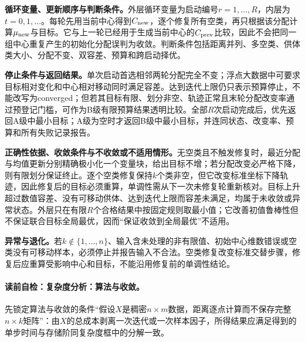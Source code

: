 \label{struct:V4-C02-CH23}
\textbf{循环变量、更新顺序与判断条件。}外层循环变量为启动编号$r=1,\ldots,R$，内层为$t=0,1,\ldots$。每轮先用当前中心得到$C_{\rm new}$，逐个修复所有空类，再只根据该分配计算$\mu_{\rm new}$与目标。它与上一轮已经用于生成当前中心的$C_{\rm prev}$比较，因此不会把同一组中心重复产生的初始化分配误判为收敛。判断条件包括距离并列、多空类、供体类大小、分配不变、双容差、预算和跨启动择优。

\label{struct:V4-C02-CH24}
\textbf{停止条件与返回结果。}单次启动首选相邻两轮分配完全不变；浮点大数据中可要求目标相对变化和中心相对移动同时满足容差。达到迭代上限仍只表示预算停止，不能改写为converged；但若其目标有限、划分非空、轨迹正常且末轮分配改变率通过预登记门槛，可作为B级有限预算结果透明比较。全部$R$次启动完成后，优先返回A级中最小目标；A级为空时才返回B级中最小目标，并连同状态、改变率、预算和所有失败记录报告。

\label{struct:V4-C02-CH25}
\textbf{正确性依据、收敛条件与不收敛或不适用情形。}无空类且不触发修复时，最近分配与均值更新分别精确极小化一个变量块，给出目标不增；若分配改变必严格下降，则有限划分保证终止。逐个空类修复保持$k$个类非空，但它改变标准坐标下降轨迹，因此修复后的目标必须重算，单调性需从下一次未修复轮重新核对。目标上升超过数值容差、没有可移动供体、达到迭代上限而容差未满足，均属于未收敛或异常状态。外层只在有限$R$个合格结果中按固定规则取最小值；它改善初值鲁棒性但不保证联合目标全局最优，因而“保证收敛到全局最优”不适用。

\begin{warningbox}
\textbf{异常与退化。}若$k\notin\{1,\ldots,n\}$、输入含未处理的非有限值、初始中心维数错误或空类没有可移动样本，必须停止并报告输入不合法。空类修复改变标准交替步骤，修复后应重算受影响中心和目标，不能沿用修复前的单调性结论。
\end{warningbox}

\label{struct:V4-C02-CH26}
\label{struct:V4-C02-CH27}
\paragraph{读前自检：复杂度分析：\kMeans{}算法与收敛。}先锁定\kMeans{}算法与收敛的条件“假设$X$是稠密$n\times m$数据，距离逐点计算而不保存完整$n\times k$矩阵”：由$X$的总成本剥离一次迭代或一次样本因子，所得结果应满足得到的单步时间与存储阶同复杂度框中的分解一致。\par

